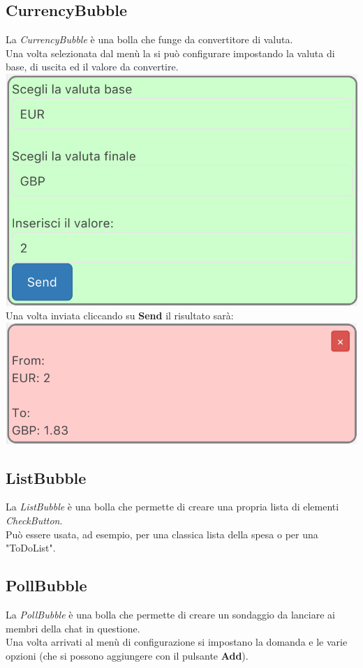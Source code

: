 \subsection{CurrencyBubble}
La \textit{CurrencyBubble} è una bolla che funge da convertitore di valuta.
\\Una volta selezionata dal menù la si può configurare impostando la valuta di base, di uscita ed il valore da convertire.\\

\includegraphics[scale=0.75]{img/currConfig.png}
\\
Una volta inviata cliccando su \textbf{Send} il risultato sarà:\\

\includegraphics[scale=0.75]{img/curr.png} 
\subsection{ListBubble}
La \textit{ListBubble} è una bolla che permette di creare una propria lista di elementi \textit{CheckButton}. \\
Può essere usata, ad esempio, per una classica lista della spesa o per una "ToDoList".

\subsection{PollBubble}
La \textit{PollBubble} è una bolla che permette di creare un sondaggio da lanciare ai membri della chat in questione.\\
Una volta arrivati al menù di configurazione si impostano la domanda e le varie opzioni (che si possono aggiungere con il pulsante \textbf{Add}).
\\

